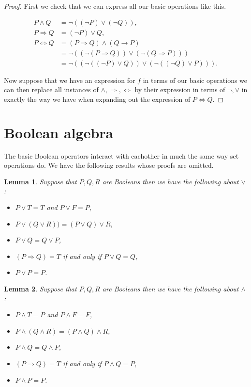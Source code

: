 \documentclass[
]{book}
\newtheorem{lemma}{Lemma}[chapter]
\theoremstyle{definition}
\theoremstyle{definition}
\theoremstyle{definition}
\theoremstyle{definition}
\theoremstyle{remark}
\begin{document}
\begin{proof}
First we check that we can express all our basic operations like this.

\begin{align*}
P \wedge Q &= \neg ( (\neg P) \vee (\neg Q)),\\
P \Rightarrow Q &= (\neg P) \vee Q, \\
P \Leftrightarrow Q &= (P \Rightarrow Q) \wedge (Q \rightarrow P)\\
&= \neg ( (\neg(P \Rightarrow Q)) \vee (\neg(Q \Rightarrow P))) \\
& = \neg ((\neg((\neg P) \vee Q)) \vee (\neg ((\neg Q) \vee P))).
\end{align*}

Now suppose that we have an expression for \(f\) in terms of our basic operations we can then replace all instances of \(\wedge, \Rightarrow, \Leftrightarrow\) by their expression in terms of \(\neg, \vee\) in exactly the way we have when expanding out the expression of \(P \Leftrightarrow Q\).
\end{proof}

\section{Boolean algebra}\label{boolean-algebra}

The basic Boolean operators interact with eachother in much the same way set operations do. We have the following results whose proofs are omitted.

\begin{lemma}

Suppose that \(P, Q, R\) are Booleans then we have the following about \(\vee\):

\begin{itemize}
\item
  \(P \vee T = T\) and \(P \vee F = P\),
\item
  \(P \vee (Q \vee R)) =(P\vee Q) \vee R\),
\item
  \(P \vee Q = Q \vee P\),
\item
  \((P \Rightarrow Q) = T\) if and only if \(P \vee Q = Q\),
\item
  \(P \vee P = P\).
\end{itemize}

\end{lemma}

\begin{lemma}

Suppose that \(P, Q, R\) are Booleans then we have the following about \(\wedge\):

\begin{itemize}
\item
  \(P \wedge T = P\) and \(P \wedge F = F\),
\item
  \(P \wedge (Q \wedge R)= (P\wedge Q) \wedge R\),
\item
  \(P \wedge Q = Q \wedge P\),
\item
  \((P \Rightarrow Q)= T\) if and only if \(P \wedge Q = P\),
\item
  \(P \wedge P = P\).
\end{itemize}

\end{lemma}
\end{document}

